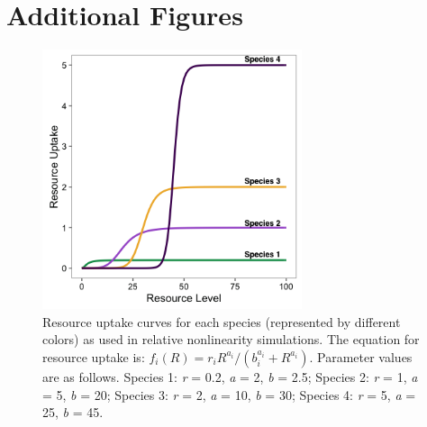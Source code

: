 \documentclass[11pt,]{article}
\begin{document}
\newpage{}

\section{Additional Figures}

\begin{figure}[!ht]
  \centering
      \includegraphics[width=3in]{./components/fourspp_Ruptake_relnonlin.png}
  \caption{Resource uptake curves for each species (represented by different colors) as used in relative nonlinearity simulations. The equation for resource uptake is: $f_{i}(R) = r_{i}R^{a_{i}} / (b_{i}^{a_{i}}+R^{a_{i}})$. Parameter values are as follows. Species 1: \emph{r} = 0.2, \emph{a} = 2, \emph{b} = 2.5; Species 2: \emph{r} = 1, \emph{a} = 5, \emph{b} = 20; Species 3: \emph{r} = 2, \emph{a} = 10, \emph{b} = 30; Species 4: \emph{r} = 5, \emph{a} = 25, \emph{b} = 45.}
\end{figure}

\newpage{}
\end{document}
